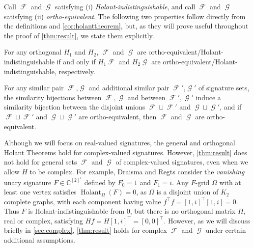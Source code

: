 \documentclass{theoretics}
\DeclareMathOperator{\fc}{\mathcal{F}}
\DeclareMathOperator{\gc}{\mathcal{G}}
\DeclareMathOperator{\holant}{Holant}
\begin{document}
Call $\fc$ and $\gc$ satisfying (i) \emph{Holant-indistinguishable}, and call $\fc$ and
$\gc$ satisfying (ii) \emph{ortho-equivalent}. 
The following two properties follow directly from the definitions and \autoref{cor:holanttheorem},
but, as they will
prove useful throughout the proof of \autoref{thm:result}, we state them explicitly.
\begin{proposition}
    For any orthogonal $H_1$ and $H_2$, $\fc$ and $\gc$ are 
    ortho-equivalent/Holant-indistinguishable if and only if
    $H_1\fc$ and $H_2\gc$ are ortho-equivalent/Holant-indistinguishable, respectively.
    \label{prop:transform}
\end{proposition}
\begin{proposition}
    For any similar pair $\fc$,$\gc$ and additional similar pair $\fc'$,$\gc'$ 
    of signature sets, the similarity bijections between $\fc,\gc$ and between $\fc',\gc'$
    induce a similarity bijection between the disjoint unions 
    $\fc \sqcup \fc'$ and $\gc \sqcup \gc'$, and if
    $\fc \sqcup \fc'$ and $\gc \sqcup \gc'$ 
    are ortho-equivalent, then $\fc$ and $\gc$ are ortho-equivalent.
    \label{prop:union}
\end{proposition}   

\begin{remark}\label{rem:complex}
Although we will focus on real-valued signatures, the general and orthogonal 
Holant Theorems hold for complex-valued signatures. However,
\autoref{thm:result} does not hold for general sets $\fc$ and $\gc$ of complex-valued
signatures, even when we allow $H$ to be complex. For example, Draisma and Regts
\cite{draisma_tensor_2013} consider the \emph{vanishing} unary signature $F \in \mathbb{C}^{[2]^1}$
defined by $F_0 = 1$ and $F_1 = i$. Any $F$-grid $\Omega$ with at least
one vertex satisfies $\holant_\Omega(F) = 0$, as $\Omega$ is a disjoint union of $K_2$ complete graphs,
with each component having value $f^\top f = [1,i]^\top [1,i] = 0$. 
Thus $F$ is Holant-indistinguishable from 0, but
there is no orthogonal matrix $H$, real or complex, satisfying $Hf = H [1,i]^\top = [0,0]^\top$.
However, as we will discuss briefly in \autoref{sec:complex}, \autoref{thm:result} holds for
complex $\fc$ and $\gc$ under certain additional assumptions.
\end{remark}
\end{document}
